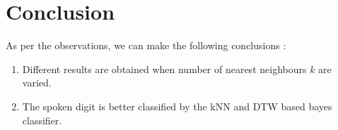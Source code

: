 \documentclass[a4paper]{article}
\begin{document}
\section{Conclusion}
	As per the observations, we can make the following conclusions :
	
	\begin{enumerate}
	  \item Different results are obtained when number of nearest neighbours $k$ are varied.   	
	  
      \item The spoken digit is better classified by the kNN and DTW based bayes classifier.  
	\end{enumerate}
    \center{          
\ldots{}    
}
\end{document}
